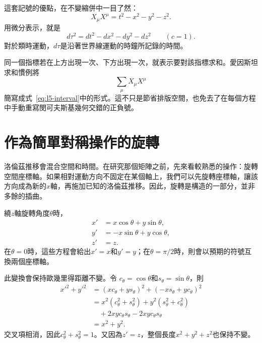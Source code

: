 \begin{classroomqa}
\end{classroomqa}

這套記號的優點，在不變縮併中一目了然：
\begin{equation}
X_\mu X^\mu=t^2-x^2-y^2-z^2.
\label{eq:l5-interval}
\end{equation}
用微分表示，就是
\begin{equation}
d\tau^2=dt^2-dx^2-dy^2-dz^2
\qquad (c=1).
\label{eq:l5-proper-time}
\end{equation}
對於類時運動，\(d\tau\)是沿著世界線運動的時鐘所記錄的時間。

同一個指標若在上方出現一次、下方出現一次，就表示要對該指標求和。愛因斯坦求和慣例將
\begin{equation}
\sum_{\mu}X_\mu X^\mu
\end{equation}
簡寫成式~\eqref{eq:l5-interval}中的形式。這不只是節省排版空間，也免去了在每個方程中手動重寫閔可夫斯基幾何交錯的正負號。

\begin{classroomqa}
\end{classroomqa}

\section{作為簡單對稱操作的旋轉}

洛倫茲推移會混合空間和時間。在研究那個矩陣之前，先來看較熟悉的操作：旋轉空間座標軸。如果相對運動方向不固定在某個軸上，我們可以先旋轉座標軸，讓該方向成為新的\(x\)軸，再施加已知的洛倫茲推移。因此，旋轉是構造的一部分，並非多餘的插曲。

繞\(z\)軸旋轉角度\(\theta\)時，
\begin{align}
x'&=x\cos\theta+y\sin\theta,\nonumber\\
y'&=-x\sin\theta+y\cos\theta,\label{eq:l5-rotation}\\
z'&=z.\nonumber
\end{align}
在\(\theta=0\)時，這些方程會給出\(x'=x\)和\(y'=y\)；在\(\theta=\pi/2\)時，則會以預期的符號互換兩個座標軸。

此變換會保持歐幾里得距離不變。令
\(c_\theta=\cos\theta\)和\(s_\theta=\sin\theta\)，則
\begin{align}
x'^2+y'^2
&=(xc_\theta+ys_\theta)^2+(-xs_\theta+yc_\theta)^2\nonumber\\
&=x^2(c_\theta^2+s_\theta^2)
  +y^2(s_\theta^2+c_\theta^2)\nonumber\\
&\quad+2xyc_\theta s_\theta-2xyc_\theta s_\theta\nonumber\\
&=x^2+y^2.
\end{align}
交叉項相消，因此\(c_\theta^2+s_\theta^2=1\)。又因為\(z'=z\)，整個長度\(x^2+y^2+z^2\)也保持不變。

